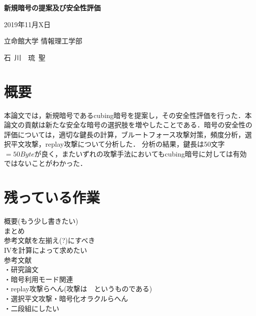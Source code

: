 \documentclass{jsarticle}
\begin{document}
\thispagestyle{empty}
\begin{center}
\vspace*{4.5cm}
{\huge\bf 新規暗号の提案及び安全性評価}
\vspace*{3cm}

{\large 2019年11月X日}
\vspace*{3cm}

{\large 立命館大学 情報理工学部}
\vspace*{5mm}

{\Large 石~川~~琉~聖}
\end{center}
\newpage 

\setcounter{page}{1}

\section*{概要}

本論文では，新規暗号であるcubing暗号を提案し，その安全性評価を行った．本論文の貢献は新たな安全な暗号の選択肢を増やしたことである．暗号の安全性の評価については，適切な鍵長の計算，ブルートフォース攻撃対策，頻度分析，選択平文攻撃，replay攻撃について分析した．
分析の結果，鍵長は50文字$=50Byte$が良く，またいずれの攻撃手法においてもcubing暗号に対しては有効ではないことがわかった．

\newpage

\tableofcontents
\clearpage
\section{残っている作業}
概要(もう少し書きたい)\\
まとめ\\
参考文献を左揃え(?)にすべき\\
IVを計算によって求めたい\\
参考文献\\
・研究論文\\
・暗号利用モード関連\\
・replay攻撃らへん(攻撃は~~というものである)\\
・選択平文攻撃・暗号化オラクルらへん\\
・二段組にしたい\\
\end{document}
